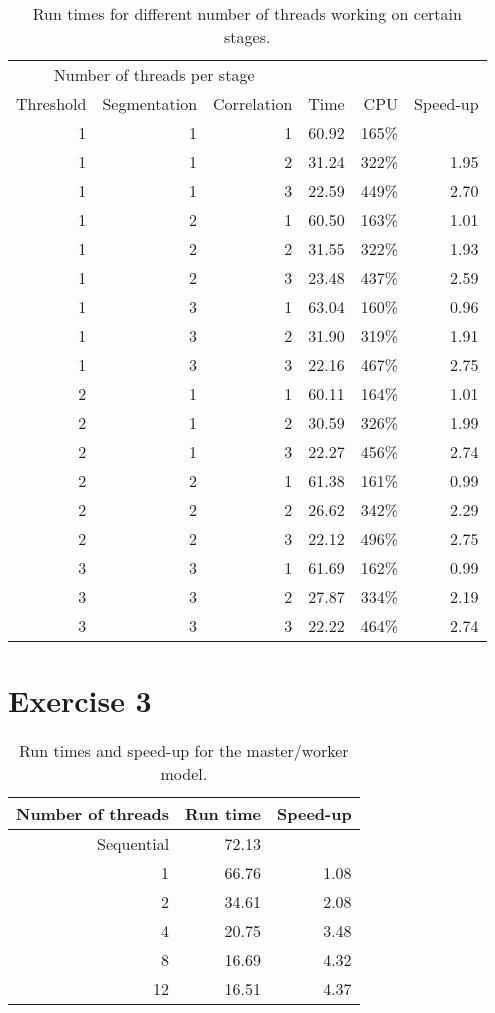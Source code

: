 \documentclass[a4paper]{article}
\begin{document}
\begin{table}[h]
	\centering
	\label{tbl:ex2}
	\caption{Run times for different number of threads working on certain stages.}
	\begin{tabular}{r|r|r|r|r|r}
		\multicolumn{3}{c|}{Number of threads per stage} & \multicolumn{2}{c}{}\\
		Threshold & Segmentation & Correlation & Time & CPU & Speed-up \\ \hline
		1 & 1 & 1 & 60.92 & 165\% &  \\
		1 & 1 & 2 & 31.24 & 322\% & 1.95 \\
		1 & 1 & 3 & 22.59 & 449\% & 2.70 \\
		1 & 2 & 1 & 60.50 & 163\% & 1.01 \\
		1 & 2 & 2 & 31.55 & 322\% & 1.93 \\
		1 & 2 & 3 & 23.48 & 437\% & 2.59 \\
		1 & 3 & 1 & 63.04 & 160\% & 0.96 \\
		1 & 3 & 2 & 31.90 & 319\% & 1.91 \\
		1 & 3 & 3 & 22.16 & 467\% & 2.75 \\
		2 & 1 & 1 & 60.11 & 164\% & 1.01 \\
		2 & 1 & 2 & 30.59 & 326\% & 1.99 \\
		2 & 1 & 3 & 22.27 & 456\% & 2.74 \\
		2 & 2 & 1 & 61.38 & 161\% & 0.99 \\
		2 & 2 & 2 & 26.62 & 342\% & 2.29 \\
		2 & 2 & 3 & 22.12 & 496\% & 2.75 \\
		3 & 3 & 1 & 61.69 & 162\% & 0.99 \\
		3 & 3 & 2 & 27.87 & 334\% & 2.19 \\
		3 & 3 & 3 & 22.22 & 464\% & 2.74 \\
	\end{tabular}
\end{table}

\section{Exercise 3}

\begin{table}
	\centering
	\caption{Run times and speed-up for the master/worker model.}
	\label{tbl:ex3}
	\begin{tabular}{r|r|r}
		Number of threads & Run time & Speed-up \\ \hline
		Sequential & 72.13 &  \\
		 1 & 66.76 & 1.08 \\
		 2 & 34.61 & 2.08 \\
		 4 & 20.75 & 3.48 \\
		 8 & 16.69 & 4.32 \\
		12 & 16.51 & 4.37 \\
	\end{tabular}
\end{table}
\end{document}
